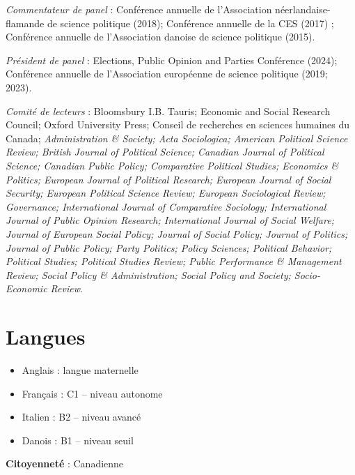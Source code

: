 \documentclass[letterpaper,fontsize=10.5pt]{scrartcl}
\begin{document}
{}\textit{Commentateur de panel} : Conférence annuelle de l'Association néerlandaise-flamande de science politique (2018); Conférence annuelle de la CES (2017) ; Conférence annuelle de l'Association danoise de science politique (2015).\\ 
\hfill \break
{}
{}\textit{Président de panel} : Elections, Public Opinion and Parties Conférence (2024); Conférence annuelle de l'Association européenne de science politique (2019; 2023).\\ 
\hfill \break
{}
{}\textit{Comité de lecteurs} : Bloomsbury I.B. Tauris; Economic and Social Research Council; Oxford University Press; Conseil de recherches en sciences humaines du Canada; \textit{Administration \& Society; Acta Sociologica; American Political Science Review; British Journal of Political Science; Canadian Journal of Political Science; Canadian Public Policy; Comparative Political Studies; Economics \& Politics; European Journal of Political Research; European Journal of Social Security; European Political Science Review; European Sociological Review; Governance; International Journal of Comparative Sociology; International Journal of Public Opinion Research; International Journal of Social Welfare; Journal of European Social Policy; Journal of Social Policy; Journal of Politics; Journal of Public Policy; Party Politics; Policy Sciences; Political Behavior; Political Studies; Political Studies Review; Public Performance \& Management Review; Social Policy \& Administration; Social Policy and Society; Socio-Economic Review}.

\section{Langues}
\begin{itemize}[itemsep=0em, topsep=0em, partopsep=0em]
	\item Anglais : langue maternelle
	\item Français : C1 -- niveau autonome
	\item Italien : B2 -- niveau avancé
	\item Danois : B1 -- niveau seuil \\
\end{itemize}

{}\textbf{Citoyenneté} : Canadienne\\
\end{document}
